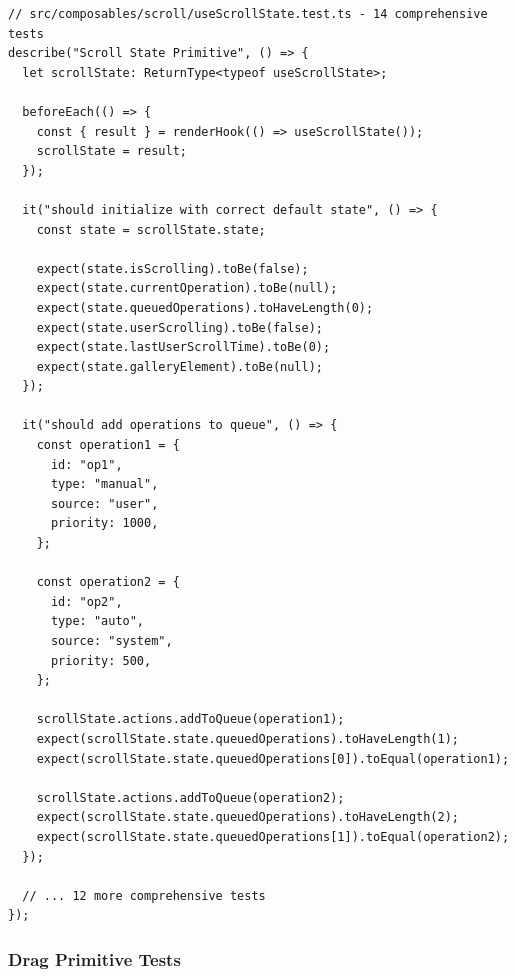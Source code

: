 \documentclass[11pt]{article}
\begin{document}
\begin{lstlisting}[style=typescript]
// src/composables/scroll/useScrollState.test.ts - 14 comprehensive tests
describe("Scroll State Primitive", () => {
  let scrollState: ReturnType<typeof useScrollState>;

  beforeEach(() => {
    const { result } = renderHook(() => useScrollState());
    scrollState = result;
  });

  it("should initialize with correct default state", () => {
    const state = scrollState.state;
    
    expect(state.isScrolling).toBe(false);
    expect(state.currentOperation).toBe(null);
    expect(state.queuedOperations).toHaveLength(0);
    expect(state.userScrolling).toBe(false);
    expect(state.lastUserScrollTime).toBe(0);
    expect(state.galleryElement).toBe(null);
  });

  it("should add operations to queue", () => {
    const operation1 = {
      id: "op1",
      type: "manual",
      source: "user",
      priority: 1000,
    };

    const operation2 = {
      id: "op2",
      type: "auto",
      source: "system",
      priority: 500,
    };

    scrollState.actions.addToQueue(operation1);
    expect(scrollState.state.queuedOperations).toHaveLength(1);
    expect(scrollState.state.queuedOperations[0]).toEqual(operation1);

    scrollState.actions.addToQueue(operation2);
    expect(scrollState.state.queuedOperations).toHaveLength(2);
    expect(scrollState.state.queuedOperations[1]).toEqual(operation2);
  });

  // ... 12 more comprehensive tests
});
\end{lstlisting}

\subsubsection{Drag Primitive Tests}
\end{document}
